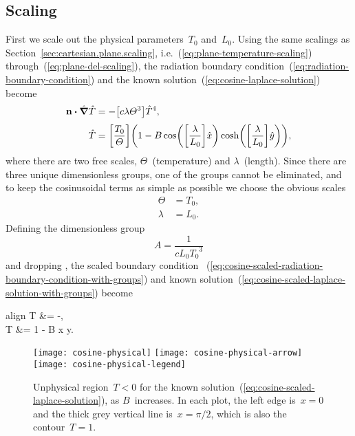 \subsection{Scaling}
\label{sec:cartesian.cosine.scaling}

First we scale out the physical parameters~$T_0$ and~$L_0$.
Using the same scalings as Section~\ref{sec:cartesian.plane.scaling},
i.e.~(\ref{eq:plane-temperature-scaling}) through~(\ref{eq:plane-del-scaling}),
the radiation boundary condition~(\ref{eq:radiation-boundary-condition})
and the known solution~(\ref{eq:cosine-laplace-solution})
become
\begin{align}
  \normalvec \dotp \scaleddel \scaled{T}
    &= -\group{c \lambda \Theta^3} \scaled{T}^4,
    \label{eq:cosine-scaled-radiation-boundary-condition-with-groups}
    \\[\tallspace]
  \scaled{T}
    &=
      \group{\frac{T_0}{\Theta}}
      \roundbr*{
        1 -
          B
          \cos \roundbr*{\group{\frac{\lambda}{L_0}} \scaled{x}}
          \cosh \roundbr*{\group{\frac{\lambda}{L_0}} \scaled{y}}
      },
    \label{eq:cosine-scaled-laplace-solution-with-groups}
\end{align}
where there are two free scales, $\Theta$~(temperature) and $\lambda$~(length).
Since there are three unique dimensionless groups,
one of the groups cannot be eliminated,
and to keep the cosinusoidal terms as simple as possible
we choose the obvious scales
\begin{align}
  \Theta &= T_0,
    \label{eq:cosine-temperature-scale} \\
  \lambda &= L_0.
    \label{eq:cosine-length-scale}
\end{align}
Defining the dimensionless group
\begin{equation}
  A = \frac{1}{c L_0 {T_0}^3}
  \label{eq:cosine-dimensionless-group}
\end{equation}
and dropping \scalingmarks,
the scaled boundary condition~%
  (\ref{eq:cosine-scaled-radiation-boundary-condition-with-groups})
and known solution~(\ref{eq:cosine-scaled-laplace-solution-with-groups})
become
\begin{important}{align}
  \normalvec \dotp \del T &= -,
    \label{eq:cosine-scaled-radiation-boundary-condition} \\[\tallspace]
  T &= 1 - B \cos x \cosh y.
    \label{eq:cosine-scaled-laplace-solution}
\end{important}

\begin{figure}
  \centering
  \texttt{[image: cosine-physical]}
  \texttt{[image: cosine-physical-arrow]}
  \texttt{[image: cosine-physical-legend]}
  \caption{
    Unphysical region~$T < 0$
    for the known solution~(\ref{eq:cosine-scaled-laplace-solution}),
    as $B$~increases.
    In each plot, the left edge is~$x = 0$
    and the thick grey vertical line is~$x = \pi/2$,
    which is also the contour~$T = 1$.
  }
  \label{fig:cosine-physical}
\end{figure}

